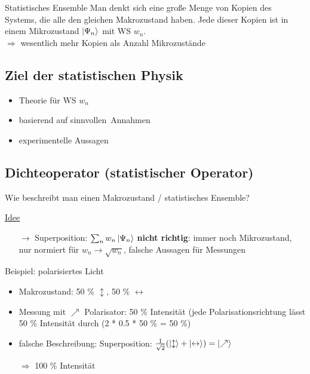 \begin{definition}{Statistisches Ensemble}
    Man denkt sich eine große Menge von Kopien des Systems, die alle den gleichen Makrozustand haben. Jede dieser Kopien ist in einem Mikrozustand $\ket{\Psi_n}$ mit WS $w_n$.\\ $\Rightarrow$ wesentlich mehr Kopien als Anzahl Mikrozustände
\end{definition}

\subsection*{Ziel der statistischen Physik}
\begin{itemize}
    \item Theorie für WS $w_n$
    \item basierend auf \glqq sinnvollen\grqq \, Annahmen
    \item experimentelle Aussagen
\end{itemize}


\subsection{Dichteoperator (statistischer Operator)}     

Wie beschreibt man einen Makrozustand / statistisches Ensemble?

\vspace{0.5cm}
\underline{Idee}
\begin{itemize}
    \item [$\rightarrow$] Superposition: $\sum_n w_n \ket{\Psi_n}$ \textbf{nicht richtig}: immer noch Mikrozustand, nur normiert für $w_n \rightarrow \sqrt{w_n}$, falsche Aussagen für Messungen
\end{itemize}

\begin{beispiel}{Beispiel: polarisiertes Licht}
    \begin{itemize}
    \item Makrozustand: 50 \% $\updownarrow$, 50 \% $\leftrightarrow$
    \item Messung mit $\nearrow$ Polarisator: 50 \% Intensität (jede Polarisationsrichtung lässt 50 \% Intensität durch (2 * 0.5 * 50 \% = 50 \%)
    \item falsche Beschreibung: Superposition: $\frac{1}{\sqrt{2}} ( \ket{\updownarrow} + \ket{\leftrightarrow}) = \ket{\nearrow}$
    \item[$\Rightarrow$] 100 \% Intensität
\end{itemize}
\end{beispiel}



